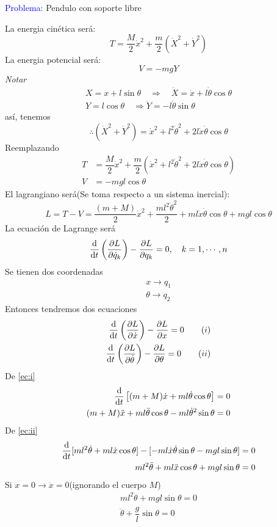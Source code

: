 \documentclass[../main]{subfiles}
\begin{document}
\textcolor{blue}{Problema:} Pendulo con soporte libre

La energia cinética será:
\begin{equation*}
    T=\dfrac{M}{2}\dot{x}^2+\dfrac{m}{2}(\dot{X}^2+\dot{Y}^2)
\end{equation*}
La energia potencial será:
\begin{equation*}
    V=-mgY
\end{equation*}
\textit{Notar}
\begin{align*}
    X=x+l\sin \theta \quad \Rightarrow \quad \dot{X}=\dot{x}+l\dot{\theta}\cos \theta\\
    Y=l\cos \theta \quad \Rightarrow \dot{Y}=-l\dot{\theta}\sin \theta
\end{align*}
así, tenemos
\begin{equation*}
    \therefore (\dot{X}^2+\dot{Y}^2)=\dot{x}^2+l^2 \dot{\theta}^2+2l\dot{x}\dot{\theta}\cos \theta
\end{equation*}
Reemplazando
\begin{align*}
    T&=\dfrac{M}{2}\dot{x}^2+\dfrac{m}{2}(\dot{x}^2+l^2\dot{\theta}^2+2l\dot{x}\dot{\theta}\cos \theta)\\
    V&=-mgl\cos \theta
\end{align*}
El lagrangiano será(Se toma respecto a un sistema inercial):
\begin{equation*}
    L=T-V=\dfrac{(m+M)}{2}\dot{x}^2+\dfrac{ml^2 \dot{\theta}^2}{2}+ml\dot{x}\dot{\theta}\cos \theta+mgl\cos \theta
\end{equation*}
La ecuación de Lagrange será
\begin{equation*}
    \dv{}{t}\left(\pdv{L}{\dot{q}_k}\right)-\pdv{L}{q_k}=0, \quad k=1,\cdots, n
\end{equation*}
Se tienen dos coordenadas
\begin{align*}
    x \rightarrow q_1 \\
    \theta \rightarrow q_2
\end{align*}
Entonces tendremos dos ecuaciones
\begin{align}
    \dv{}{t}\left(\pdv{L}{\dot{x}}\right)-\pdv{L}{x}=0 \tag{$i$} \label{ec:i}\\
    \dv{}{t}\left(\pdv{L}{\dot{\theta}}\right)-\pdv{L}{\theta}=0 \tag{$ii$} \label{ec:ii}
\end{align}
De \eqref{ec:i}
\begin{align*}
    \dv{}{t}\left[(m+M)\dot{x}+ml\dot{\theta}\cos \theta\right]&=0 \\
    (m+M)\ddot{x}+ml\ddot{\theta}\cos \theta-ml\dot{\theta}^2\sin \theta&=0
\end{align*}
De \eqref{ec:ii}
\begin{align*}
    \dv{}{t}[ml^2 \dot{\theta}+ml\dot{x}\cos \theta]-[-ml\dot{x}\dot{\theta}\sin \theta-mgl\sin \theta]&=0\\
    ml^2\ddot{\theta}+ml\ddot{x}\cos \theta+mgl\sin \theta&=0
\end{align*}
Si $x=0 \rightarrow \ddot{x}=0$(ignorando el cuerpo $M$)
\begin{align*}
    ml^2 \ddot{\theta}+mgl\sin \theta=0\\
    \ddot{\theta}+\dfrac{g}{l}\sin \theta =0
\end{align*}
\end{document}
